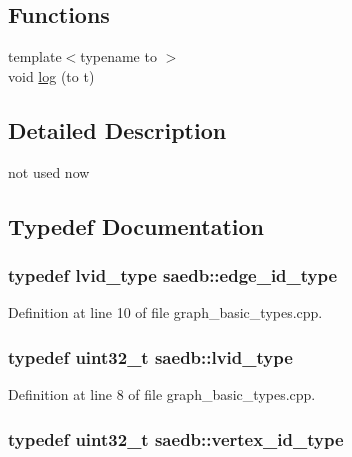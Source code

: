 \subsection*{Functions}
\begin{DoxyCompactItemize}
\item 
{\footnotesize template$<$typename to $>$ }\\void \hyperlink{namespacesaedb_ae9fdd1f0012c6fc9946f2dc123fe90e0}{log} (to t)
\end{DoxyCompactItemize}


\subsection{Detailed Description}
not used now 

\subsection{Typedef Documentation}
\hypertarget{namespacesaedb_af76c9a21f199f95828dd18699754cad1}{
\subsubsection[{edge\-\_\-id\-\_\-type}]{\setlength{\rightskip}{0pt plus 5cm}typedef {\bf lvid\-\_\-type} {\bf saedb\-::edge\-\_\-id\-\_\-type}}}\label{d9/dc5/namespacesaedb_af76c9a21f199f95828dd18699754cad1}


Definition at line 10 of file graph\-\_\-basic\-\_\-types.\-cpp.

\hypertarget{namespacesaedb_ae0f2df508bdfd29505d57534c8ed4a65}{
\subsubsection[{lvid\-\_\-type}]{\setlength{\rightskip}{0pt plus 5cm}typedef uint32\-\_\-t {\bf saedb\-::lvid\-\_\-type}}}\label{d9/dc5/namespacesaedb_ae0f2df508bdfd29505d57534c8ed4a65}


Definition at line 8 of file graph\-\_\-basic\-\_\-types.\-cpp.

\hypertarget{namespacesaedb_a502e07e24003e811ae3bd73514c2798a}{
\subsubsection[{vertex\-\_\-id\-\_\-type}]{\setlength{\rightskip}{0pt plus 5cm}typedef uint32\-\_\-t {\bf saedb\-::vertex\-\_\-id\-\_\-type}}}\label{d9/dc5/namespacesaedb_a502e07e24003e811ae3bd73514c2798a}


